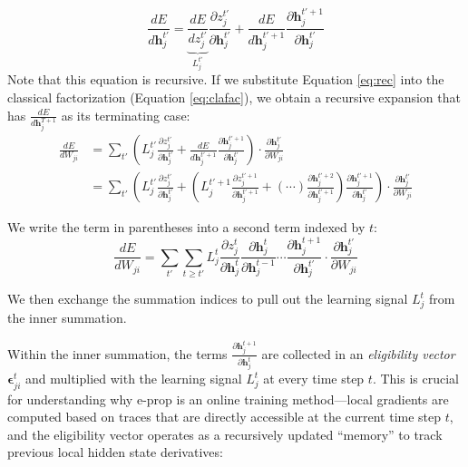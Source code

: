         \begin{equation}\label{eq:rec}
        \frac{dE}{d\mathbf{h}_j^{t'}} = \underbrace{\frac{dE}{dz_j^{t'}}}_{L^{t'}_j} \frac{\partial z_j^{t'}}{\partial\mathbf{h}_j^{t'}} + \frac{dE}{d\mathbf{h}_j^{t'+1}}\frac{\partial\mathbf{h}_j^{t'+1}}{\partial\mathbf{h}_j^{t'}}
        \end{equation}
        Note that this equation is recursive.
        If we substitute Equation \ref{eq:rec} into the classical factorization (Equation \ref{eq:clafac}), we obtain a recursive expansion that has $\frac{dE}{d\mathbf{h}^{T+1}_j}$ as its terminating case:
        \begin{align}
        \frac{dE}{dW_{ji}} &= \sum_{t'}\left(L_j^{t'}\frac{\partial z_j^{t'}}{\partial\mathbf{h}_j^{t'}} + \frac{dE}{d\mathbf{h}_j^{t'+1}}\frac{\partial\mathbf{h}_j^{t'+1}}{\partial\mathbf{h}_j^{t'}}\right)\cdot\frac{\partial\mathbf{h}_j^{t'}}{\partial W_{ji}}\\
        &= \sum_{t'}\left(L_j^{t'}\frac{\partial z_j^{t'}}{\partial\mathbf{h}_j^{t'}} + \left( L^{t'+1}_j \frac{\partial z_j^{t'+1}}{\partial\mathbf{h}_j^{t'+1}} + (\cdots)\frac{\partial\mathbf{h}_j^{t'+2}}{\partial\mathbf{h}_j^{t'+1}}  \right) \frac{\partial\mathbf{h}_j^{t'+1}}{\partial\mathbf{h}_j^{t'}}\right)\cdot\frac{\partial\mathbf{h}_j^{t'}}{\partial W_{ji}}
        \end{align}

        We write the term in parentheses into a second term indexed by $t$:
        \begin{equation}
        \frac{dE}{dW_{ji}} = \sum_{t'}\sum_{t\geq t'}L^t_j\frac{\partial z_j^t}{\partial\mathbf{h}_j^t}\frac{\partial\mathbf{h}^t_j}{\partial\mathbf{h}_j^{t-1}} \cdots \frac{\partial\mathbf{h}_j^{t+1}}{\partial\mathbf{h}_j^{t'}}\cdot\frac{\partial\mathbf{h}_j^{t'}}{\partial W_{ji}}
        \end{equation}

        We then exchange the summation indices to pull out the learning signal $L_j^t$ from the inner summation.

        Within the inner summation, the terms $\frac{\partial\mathbf{h}_j^{t+1}}{\partial\mathbf{h}_j^t}$ are collected in an \emph{eligibility vector} $\mathbf{\epsilon}^t_{ji}$ and multiplied with the learning signal $L^t_j$ at every time step $t$.
        This is crucial for understanding why e-prop is an online training method---local gradients are computed based on traces that are directly accessible at the current time step $t$, and the eligibility vector operates as a recursively updated ``memory'' to track previous local hidden state derivatives:

